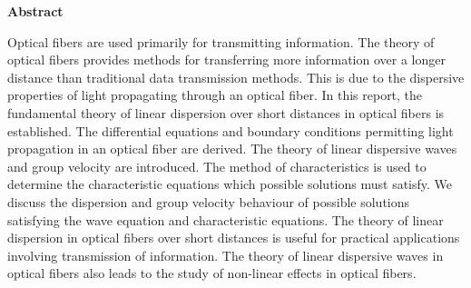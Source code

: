 \documentclass[12pt]{article}
\theoremstyle{definition}
\numberwithin{equation}{section}
\renewcommand{\baselinestretch}{1.5} %
\begin{document}












\pagebreak
{}

\tableofcontents
{}

\newpage


\begin{center}

{\Large \bf Abstract}
\end{center}
Optical fibers are used primarily for transmitting information. The theory of optical fibers provides methods for transferring more information over a longer distance than traditional data transmission methods. This is due to the dispersive properties of light propagating through an optical fiber. In this report, the fundamental theory of linear dispersion over short distances in optical fibers is established. The differential equations and boundary conditions permitting light propagation in an optical fiber are derived. The theory of linear dispersive waves and group velocity are introduced. The method of characteristics is used to determine the characteristic equations which possible solutions must satisfy. We discuss the dispersion and group velocity behaviour of possible solutions satisfying the wave equation and characteristic equations. The theory of linear dispersion in optical fibers over short distances is useful for practical applications involving transmission of information. The theory of linear dispersive waves in optical fibers also leads to the study of non-linear effects in optical fibers.
\pagebreak
{}
\end{document}
